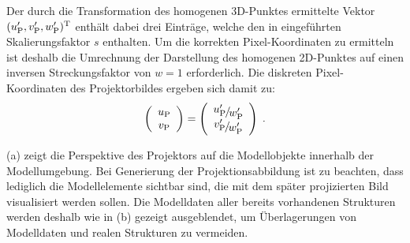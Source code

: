
Der durch die Transformation des homogenen 3D-Punktes ermittelte Vektor $(u_{{\mathrm{P}}}',v_{{\mathrm{P}}}',w_{{\mathrm{P}}}')^{\mathrm{T}}$ enthält dabei drei Einträge, welche den in  eingeführten Skalierungsfaktor $s$ enthalten. Um die korrekten Pixel-Koordinaten zu ermitteln ist deshalb die Umrechnung der Darstellung des homogenen 2D-Punktes auf einen inversen Streckungsfaktor von $w=1$ erforderlich. Die diskreten Pixel-Koordinaten des Projektorbildes ergeben sich damit zu:
%
%
\begin{equation}
\mat{c}{
u_{\ind{P}}\\
v_{\ind{P}}
}
=
\mat{c}{
\nicefrac{u_{\ind{P}}'}{w_{\ind{P}}'}\\
\nicefrac{v_{\ind{P}}'}{w_{\ind{P}}'}
} \; \text{.}
\end{equation}

 (a) zeigt die Perspektive des Projektors auf die Modellobjekte innerhalb der Modellumgebung. Bei Generierung der Projektionsabbildung ist zu beachten, dass lediglich die Modellelemente sichtbar sind, die mit dem später projizierten Bild visualisiert werden sollen. Die Modelldaten aller bereits vorhandenen Strukturen werden deshalb wie in  (b) gezeigt ausgeblendet, um Überlagerungen von Modelldaten und realen Strukturen zu vermeiden.

\prever{
}

